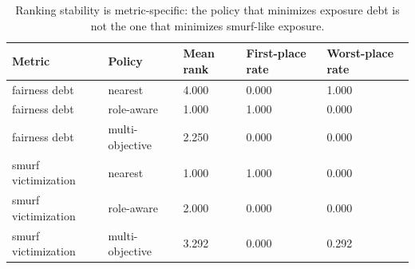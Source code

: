 \begin{table}[t]
\centering
\small
\caption{Ranking stability is metric-specific: the policy that minimizes exposure debt is not the one that minimizes smurf-like exposure.}
\label{tab:risk-transfer}
\begin{tabularx}{\textwidth}{p{}p{}p{}p{}p{}}
\toprule
Metric & Policy & Mean rank & First-place rate & Worst-place rate \\
\midrule
fairness debt & nearest & 4.000 & 0.000 & 1.000 \\
fairness debt & role-aware & 1.000 & 1.000 & 0.000 \\
fairness debt & multi-objective & 2.250 & 0.000 & 0.000 \\
smurf victimization & nearest & 1.000 & 1.000 & 0.000 \\
smurf victimization & role-aware & 2.000 & 0.000 & 0.000 \\
smurf victimization & multi-objective & 3.292 & 0.000 & 0.292 \\
\bottomrule
\end{tabularx}
\end{table}
